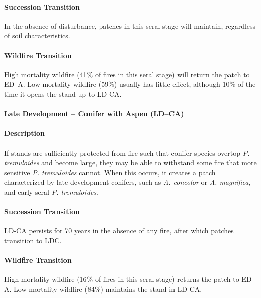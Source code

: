 \paragraph{Succession Transition} In the absence of disturbance, patches in this seral stage will maintain, regardless of soil characteristics.

\paragraph{Wildfire Transition} High mortality wildfire (41\% of fires in this seral stage) will return the patch to ED–A. Low mortality wildfire (59\%) usually has little effect, although 10\% of the time it opens the stand up to LD-CA.

\noindent\hrulefill


\paragraph{Late Development – Conifer with Aspen (LD–CA)}

\paragraph{Description} If stands are sufficiently protected from fire such that conifer species overtop \emph{P. tremuloides} and become large, they may be able to withstand some fire that more sensitive \emph{P. tremuloides} cannot. When this occurs, it creates a patch characterized by late development conifers, such as \emph{A. concolor} or \emph{A. magnifica}, and early seral \emph{P. tremuloides}. 

\paragraph{Succession Transition} LD-CA persists for 70 years in the absence of any fire, after which patches transition to LDC. 

\paragraph{Wildfire Transition} High mortality wildfire (16\% of fires in this seral stage) returns the patch to ED-A. Low mortality wildfire (84\%) maintains the stand in LD-CA.

\noindent\hrulefill




